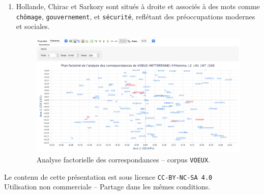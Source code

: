 \documentclass[xcolor={table,usenames,dvipsnames}]{article}
\begin{document}
\begin{enumerate}
 	\item Hollande, Chirac et Sarkozy sont situés à droite et associés à des mots comme \texttt{chômage}, \texttt{gouvernement}, et \texttt{sécurité}, reflétant des préoccupations modernes et sociales.
 	 	 	\begin{figure}[!h] %
 		\centering
 		\includegraphics[width=1\linewidth]{img/afc.png}
 		\caption{Analyse factorielle des correspondances -- corpus \texttt{VOEUX}.}
 		\label{fig:usa_algerie}
 	\end{figure}
\end{enumerate}



		\printbibliography
		
	\centering
{\small Le contenu de cette présentation est sous licence \texttt{CC-BY-NC-SA 4.0}\\Utilisation non commerciale -- Partage dans les mêmes conditions.\\}
\href{https://creativecommons.org/licenses/by-nc-sa/4.0/deed.fr}{\ccbyncsa}
	
\end{document}
